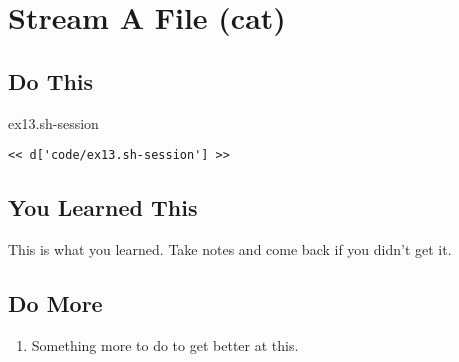 \chapter{Stream A File (cat)}

\section{Do This}

\begin{code}{ex13.sh-session}
\begin{Verbatim}
<< d['code/ex13.sh-session'] >>
\end{Verbatim}
\end{code}


\section{You Learned This}

This is what you learned.  Take notes and come back if you didn't get it.

\section{Do More}

\begin{enumerate}
\item Something more to do to get better at this.
\end{enumerate}

